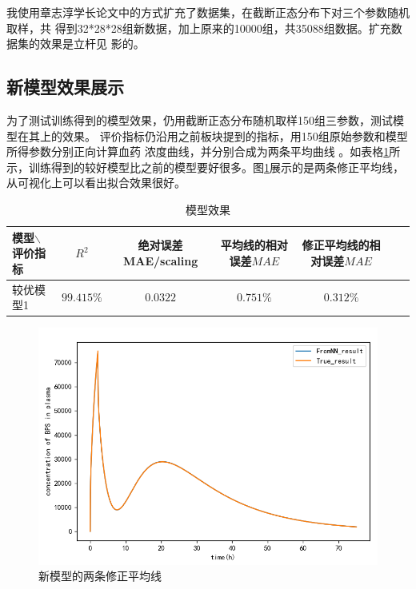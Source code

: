 \documentclass{article}
\begin{document}
我使用章志淳学长论文中的方式扩充了数据集，在截断正态分布下对三个参数随机取样，共
得到32*28*28组新数据，加上原来的10000组，共35088组数据。扩充数据集的效果是立杆见
影的。

\subsection*{新模型效果展示}

为了测试训练得到的模型效果，仍用截断正态分布随机取样150组三参数，测试模型在其上的效果。
评价指标仍沿用之前板块提到的指标，用150组原始参数和模型所得参数分别正向计算血药
浓度曲线，并分别合成为两条平均曲线
。如表格\ref{tab1}所示，训练得到的较好模型比之前的模型要好很多。图\ref{fig9}展示的是两条修正平均线，从可视化上可以看出拟合效果很好。

\begin{table}[htbp] 
\caption{\label{tab1}模型效果} 
\begin{tabular}[t]{l|cccccc}
  \toprule
  \small{模型$\backslash$评价指标 }& $R^2$ & \small{绝对误差MAE/{scaling}} & \small{平均线的相对误差$MAE$} & \small{修正平均线的相对误差$MAE$}  \\
  \midrule
  较优模型1 & $99.415\%$ &$0.0322$ & $0.751\%$ & $0.312\%$ \\

  \bottomrule
\end{tabular}
\end{table}

\begin{figure}[H]
  \centering
  \includegraphics[scale=0.5]{pic9_1.png}
  \caption{新模型的两条修正平均线}
  \label{fig9}
\end{figure}
\end{document}
